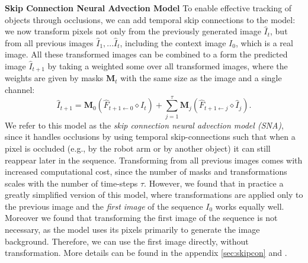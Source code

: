 \noindent \textbf{Skip Connection Neural Advection Model}
To enable effective tracking of objects through occlusions, we can add temporal skip connections to the model: we now transform pixels not only from the previously generated image $\hat{I}_t$, but from all previous images $\hat{I}_1,...\hat{I}_{t}$, including the context image $I_0$, which is a real image. All these transformed images can be combined to a form the predicted image $\hat{I}_{t+1}$ by taking a weighted some over all transformed images, where the weights are given by masks $\mathbf{M}_t$ with the same size as the image and a single channel:
\begin{equation}
\hat{I}_{t+1} =  \mathbf{M}_{0} (\hat{F}_{t+1 \leftarrow 0} \diamond I_t) +  \sum_{j=1}^{\tau} \mathbf{M}_{j} (\hat{F}_{t+1 \leftarrow j} \diamond  \hat{I}_j).
\end{equation}
We refer to this model as the \emph{skip connection neural advection model (SNA)}, since it handles occlusions by using temporal skip-connections such that when a pixel is occluded (e.g., by the robot arm or by another object) it can still reappear later in the sequence.
Transforming from all previous images comes with increased computational cost, since the number of masks and transformations scales with the number of time-steps $\tau$. However, we found that in practice a greatly simplified version of this model, where transformations are applied only to the previous image and the \emph{first image} of the sequence $I_0$ works equally well. Moreover we found that transforming the first image of the sequence is not necessary, as the model uses its pixels primarily to generate the image background. Therefore, we can use the first image directly, without transformation. More details can be found in the appendix \ref{sec:skipcon} and \cite{sna}.